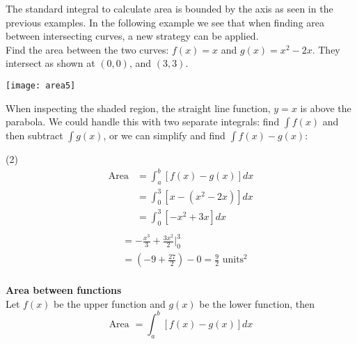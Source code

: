 The standard integral to calculate area is bounded by the axis as seen in the previous examples. In the following example we see that when finding area between intersecting curves, a new strategy can be applied. \medskip\\

\example Find the area between the two curves: $f(x)=x$ and $g(x)=x^2-2x$. They intersect as shown at $(0,0)$, and $(3,3)$.
\begin{center}\texttt{[image: area5]}\end{center}
\solution When inspecting the shaded region, the straight line function, $y=x$ is above the parabola. We could handle this with two separate integrals: find $\int f(x)$ and then subtract $\int g(x)$, or we can simplify and find $\int f(x)-g(x)$:
\begin{tasks}[label-offset=-5em](2)
\task[]\begin{align*}
\text{Area}&=\int_a^b[f(x)-g(x)]dx\\
&=\int_0^3[x-(x^2-2x)]dx\\
&=\int_0^3[-x^2+3x]dx\\
\end{align*}
\task[]\begin{align*}
&=-\frac{x^3}{3}+\frac{3x^2}{2}\Big\vert_0^3\\
&=\left(-9+\frac{27}{2}\right)-0=\frac{9}{2}\text{ units}^2\\
\end{align*}
\end{tasks}
\begin{tcolorbox}
\textbf{Area between functions}\\
Let $f(x)$ be the upper function and $g(x)$ be the lower function, then\\
\[\text{Area }=\int_a^b[f(x)-g(x)]dx\]
\end{tcolorbox}

